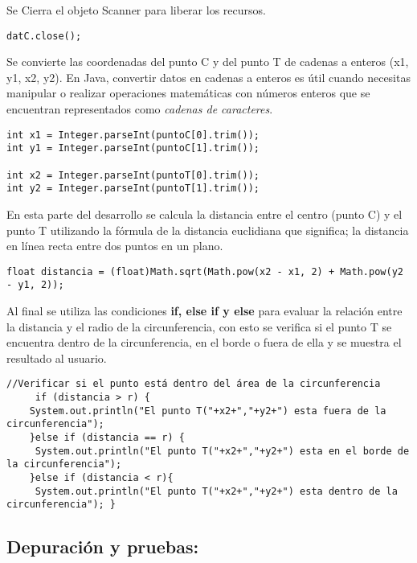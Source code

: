 Se Cierra el objeto Scanner para liberar los recursos.
\begin{lstlisting}[style=javaStyle]
                  datC.close(); 
\end{lstlisting}
Se convierte las coordenadas del punto C y del punto T de cadenas a enteros (x1, y1, x2, y2).
En Java, convertir datos en cadenas a enteros es útil cuando necesitas manipular o realizar operaciones matemáticas con números enteros que se encuentran representados como \textit{cadenas de caracteres}.
\begin{lstlisting}[style=javaStyle]
int x1 = Integer.parseInt(puntoC[0].trim());
int y1 = Integer.parseInt(puntoC[1].trim());
        
int x2 = Integer.parseInt(puntoT[0].trim());
int y2 = Integer.parseInt(puntoT[1].trim());
\end{lstlisting}

En esta parte del desarrollo se calcula la distancia entre el centro (punto C) y el punto T utilizando la fórmula de la distancia euclidiana que significa; la distancia en línea recta entre dos puntos en un plano.
\begin{lstlisting}[style=javaStyle]
float distancia = (float)Math.sqrt(Math.pow(x2 - x1, 2) + Math.pow(y2 - y1, 2));   
\end{lstlisting}

Al final se utiliza las condiciones \textbf{if, else if y else} para evaluar la relación entre la distancia y el radio de la circunferencia, con esto se verifica si el punto T se encuentra dentro de la circunferencia, en el borde o fuera de ella y se muestra el resultado al usuario.
\begin{lstlisting}[style=javaStyle]
//Verificar si el punto está dentro del área de la circunferencia
     if (distancia > r) {
    System.out.println("El punto T("+x2+","+y2+") esta fuera de la circunferencia");
    }else if (distancia == r) {
     System.out.println("El punto T("+x2+","+y2+") esta en el borde de la circunferencia");
    }else if (distancia < r){
     System.out.println("El punto T("+x2+","+y2+") esta dentro de la circunferencia"); }
\end{lstlisting}

\subsection{\textbf{Depuración y pruebas:}}

